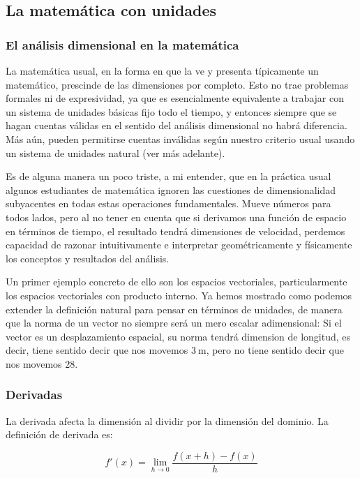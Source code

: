 \documentclass{article}
\begin{document}
\subsection{La matemática con unidades}

\subsubsection{El análisis dimensional en la matemática}

La matemática usual, en la forma en que la ve y presenta típicamente un matemático, prescinde de las dimensiones por completo.
Esto no trae problemas formales ni de expresividad, ya que es esencialmente equivalente a trabajar con un sistema de unidades
básicas fijo todo el tiempo, y entonces siempre que se hagan cuentas válidas en el sentido del análisis dimensional no habrá
diferencia. Más aún, pueden permitirse cuentas inválidas según nuestro criterio usual usando un sistema de unidades natural (ver
más adelante).

Es de alguna manera un poco triste, a mi entender, que en la práctica usual algunos estudiantes de matemática
ignoren las cuestiones de dimensionalidad subyacentes en todas estas operaciones fundamentales. Mueve números para
todos lados, pero al no tener en cuenta que si derivamos una función de espacio en términos de tiempo, el resultado
tendrá dimensiones de velocidad, perdemos capacidad de razonar intuitivamente e interpretar geométricamente y físicamente
los conceptos y resultados del análisis.

Un primer ejemplo concreto de ello son los espacios vectoriales, particularmente los espacios vectoriales con producto interno.
Ya hemos mostrado como podemos extender la definición natural para pensar en términos de unidades, de manera que la norma de un
vector no siempre será un mero escalar adimensional: Si el vector es un desplazamiento espacial, su norma tendrá dimension de
longitud, es decir, tiene sentido decir que nos movemos $\SI{3}{\meter}$, pero no tiene sentido decir que nos movemos $28$.

\subsubsection{Derivadas}

La derivada afecta la dimensión al dividir por la dimensión del dominio. La definición de derivada es:

$$f'(x) = \lim_{h \rightarrow 0}{\frac{f(x+h) - f(x)}{h}}$$
\end{document}
